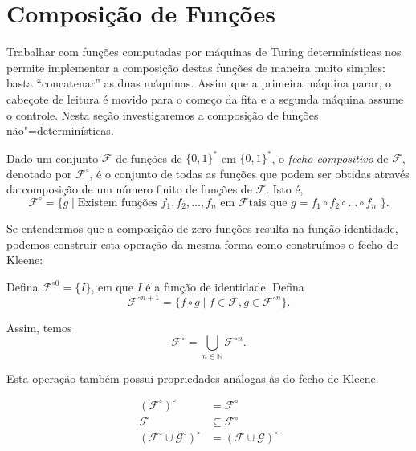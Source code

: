 \section{Composição de Funções}

Trabalhar com funções computadas por máquinas de Turing determinísticas
nos permite implementar a composição destas funções de maneira muito simples:
basta ``concatenar'' as duas máquinas.
Assim que a primeira máquina parar,
o cabeçote de leitura é movido para o começo da fita
e a segunda máquina assume o controle.
Nesta seção investigaremos a composição de funções não"=determinísticas.

\begin{definition}
    Dado um conjunto $\mathcal F$ de funções de $\{0, 1\}^*$ em $\{0, 1\}^*$,
    o \emph{fecho compositivo} de $\mathcal F$,
    denotado por $\mathcal F^\circ$,
    é o conjunto de todas as funções que podem ser obtidas
    através da composição de um número finito de funções de $\mathcal F$.
    Isto é,
    \begin{equation*}
        \mathcal F^\circ = \{g \mid
            \text{Existem funções $f_1, f_2, \dots, f_n$ em $\mathcal F$
                tais que $g = f_1 \circ f_2 \circ \dots \circ f_n$
            }
        \}.
    \end{equation*}
\end{definition}

Se entendermos que a composição de zero funções resulta
na função identidade,
podemos construir esta operação da mesma forma como construímos o fecho de Kleene:

Defina $\mathcal F^{\circ 0} = \{I\}$,
em que $I$ é a função de identidade.
Defina
\begin{equation*}
    \mathcal F^{\circ n+1} = \{ f \circ g \mid
        f \in \mathcal F, g \in \mathcal F^{\circ n}
    \}.
\end{equation*}

Assim, temos
\begin{equation*}
    \mathcal F^\circ = \bigcup_{n \in \mathbb N} \mathcal F^{\circ n}.
\end{equation*}

Esta operação também possui propriedades análogas às do fecho de Kleene.

\begin{proposition}
    \begin{align*}
        (\mathcal F^\circ)^\circ &= \mathcal F^\circ \\
        \mathcal F &\subseteq \mathcal F^\circ \\
        (\mathcal F^\circ \cup \mathcal G^\circ)^\circ &=
            (\mathcal F \cup \mathcal G)^\circ
    \end{align*}
\end{proposition}

